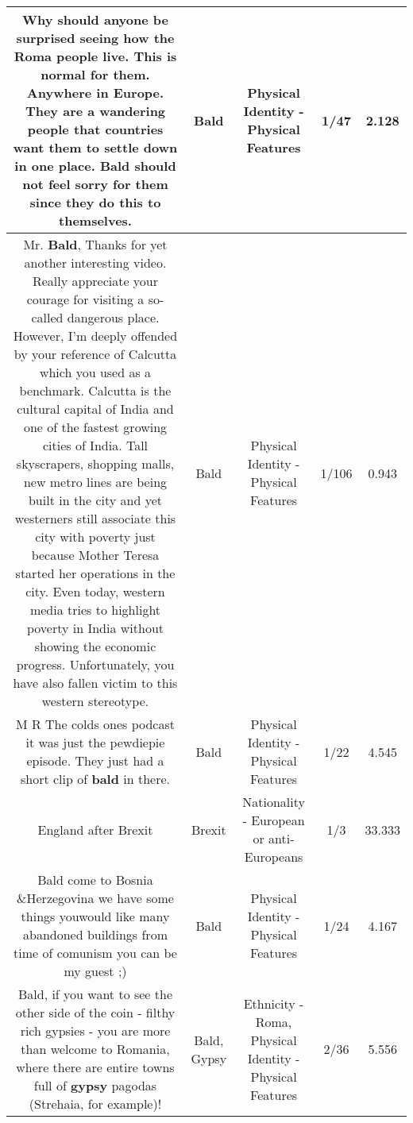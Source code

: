 \documentclass[11pt]{article}
\newlength\mylength
\begin{document}
\begin{center}
\begin{longtable}{|C{.65\mylength}|C{.30\mylength}|C{.12\mylength}|C{.12\mylength}|C{.12\mylength}|}
  \small Why should anyone be surprised seeing how the Roma people live. This is normal for them. Anywhere in Europe. They are a wandering people that countries want them to settle down in one place. \textbf{Bald} should not feel sorry for them since they do this to themselves.\normalsize   & Bald & Physical Identity - Physical Features & 1/47 & 2.128 \\  \hline
  \small Mr. \textbf{Bald}, Thanks for yet another interesting video. Really appreciate your courage for visiting a so-called dangerous place. However, I'm deeply offended by your reference of Calcutta which you used as a benchmark. Calcutta is the cultural capital of India and one of the fastest growing cities of India. Tall skyscrapers, shopping malls, new metro lines are being built in the city and yet westerners still associate this city with poverty just because Mother Teresa started her operations in the city. Even today, western media tries to highlight poverty in India without showing the economic progress. Unfortunately, you have also fallen victim to this western stereotype.\normalsize   & Bald & Physical Identity - Physical Features & 1/106 & 0.943 \\  \hline
  \small M R The colds ones podcast it was just the pewdiepie episode. They just had a short clip of \textbf{bald} in there.\normalsize   & Bald & Physical Identity - Physical Features & 1/22 & 4.545 \\  \hline
  \small England after Brexit\normalsize   & Brexit & Nationality - European or anti-Europeans & 1/3 & 33.333 \\  \hline
  \small Bald come to Bosnia \&Herzegovina we have some things youwould like many abandoned buildings from time of comunism you can be my guest ;)\normalsize   & Bald & Physical Identity - Physical Features & 1/24 & 4.167 \\  \hline
  \small Bald, if you want to see the other side of the coin - filthy rich gypsies - you are more than welcome to Romania, where there are entire towns full of \textbf{gypsy} pagodas (Strehaia, for example)!\normalsize   & Bald, Gypsy & Ethnicity - Roma, Physical Identity - Physical Features & 2/36 & 5.556 \\  \hline

\end{longtable}
\end{center}
\end{document}
